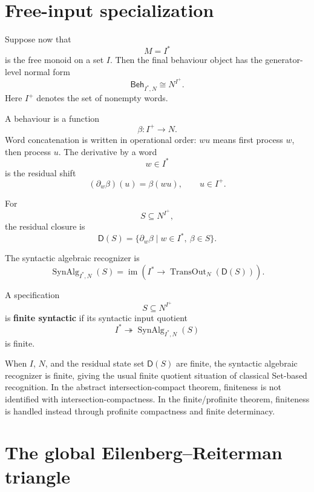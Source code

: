 \section{Free-input specialization}
\label{sec:eilenberg-free-input-specialization}

Suppose now that
\[
M=I^\ast
\]
is the free monoid on a set \(I\). Then the final behaviour object has the
generator-level normal form
\[
\mathsf{Beh}_{I^\ast,N}
\cong
N^{I^+}.
\]
Here \(I^+\) denotes the set of nonempty words.

A behaviour is a function
\[
\beta:I^+\to N.
\]
Word concatenation is written in operational order: \(wu\) means first process
\(w\), then process \(u\). The derivative by a word
\[
w\in I^\ast
\]
is the residual shift
\[
(\partial_w\beta)(u)=\beta(wu),
\qquad
u\in I^+.
\]

For
\[
S\subseteq N^{I^+},
\]
the residual closure is
\[
\mathsf D(S)
=
\{\partial_w\beta\mid w\in I^\ast,\ \beta\in S\}.
\]

The syntactic algebraic recognizer is
\[
\operatorname{SynAlg}_{I^\ast,N}(S)
=
\operatorname{im}
\left(
I^\ast
\to
\operatorname{TransOut}_N(\mathsf D(S))
\right).
\]

\begin{definition}
\label{def:eilenberg-finite-syntactic-specification}
A specification
\[
S\subseteq N^{I^+}
\]
is \textbf{finite syntactic} if its syntactic input quotient
\[
I^\ast
\twoheadrightarrow
\operatorname{SynAlg}_{I^\ast,N}(S)
\]
is finite.
\end{definition}

\begin{remark}
\label{rem:eilenberg-finite-state-special-case}
When \(I\), \(N\), and the residual state set \(\mathsf D(S)\) are finite,
the syntactic algebraic recognizer is finite, giving the usual finite
quotient situation of classical Set-based recognition. In the abstract
intersection-compact theorem, finiteness is not identified with
intersection-compactness. In the finite/profinite theorem, finiteness is
handled instead through profinite compactness and finite determinacy.
\end{remark}

\section{The global Eilenberg--Reiterman triangle}
\label{sec:eilenberg-reiterman-triangle}

